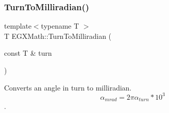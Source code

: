 \mbox{\label{group___e_g_x_math-_angle_conversions-_turn_ga2aea2621472294ce4c25ac7e55db51c6}} 
\subsubsection{\texorpdfstring{Turn\+To\+Milliradian()}{TurnToMilliradian()}}
{\footnotesize\ttfamily template$<$typename T $>$ \\
T E\+G\+X\+Math\+::\+Turn\+To\+Milliradian (\begin{DoxyParamCaption}\item[{const T \&}]{turn }\end{DoxyParamCaption})}



Converts an angle in turn to milliradian. \[\alpha_{mrad}=2\pi\alpha_{turn}*10^3\]. 

